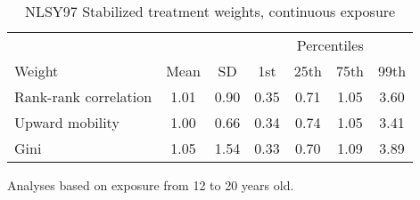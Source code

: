 \begin{table}[htp]
\centering
\footnotesize
\setlength{\tabcolsep}{10pt}
\renewcommand{\arraystretch}{1}
\begin{threeparttable}
\centering
\caption{NLSY97 Stabilized treatment weights, continuous exposure} 
\label{tab:nlsy97_ipt_weigths_z}
\begin{tabular}{lcccccc}
  \hline
\multicolumn{3}{c}{} & \multicolumn{4}{c}{Percentiles} \\ 
 \cmidrule{4-7} 
Weight & Mean & SD & 1st & 25th & 75th & 99th \\ 
  \hline
Rank-rank correlation & 1.01 & 0.90 & 0.35 & 0.71 & 1.05 & 3.60 \\ 
  Upward mobility & 1.00 & 0.66 & 0.34 & 0.74 & 1.05 & 3.41 \\ 
  Gini & 1.05 & 1.54 & 0.33 & 0.70 & 1.09 & 3.89 \\ 
   \hline
\end{tabular}
\begin{tablenotes}
\footnotesize
\item Analyses based on exposure from 12 to 20 years old. 
\end{tablenotes}
\end{threeparttable}
\end{table}
